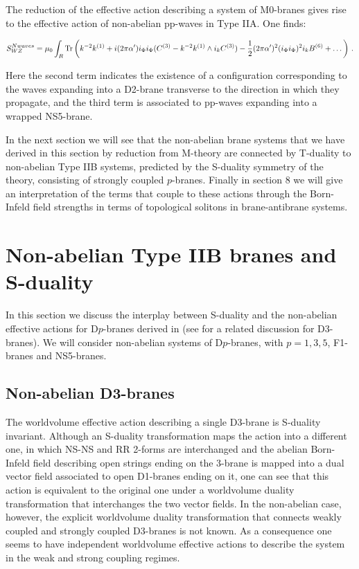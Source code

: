 \documentclass[12pt,a4paper]{article}
\begin{document}
The reduction of the effective action describing a system of M0-branes
gives rise to the effective action of non-abelian pp-waves in 
Type IIA. One finds:

\begin{equation}
\label{ppwaves}
S^{N waves}_{WZ}=\mu_0\int_R {\rm Tr}\left(k^{-2}k^{(1)}+i
(2\pi\alpha^\prime)i_\Phi i_\Phi (C^{(3)}-k^{-2}k^{(1)}\wedge
i_k C^{(3)})-\frac12 (2\pi\alpha^\prime)^2 (i_\Phi i_\Phi)^2
i_k B^{(6)}+\dots\right)\, .
\end{equation}

\noindent Here the second term indicates the existence of a configuration
corresponding to the waves expanding into a D2-brane transverse to
the direction in which they propagate, and the third term is
associated to pp-waves expanding into a wrapped NS5-brane. 


In the next section we will see that the non-abelian brane
systems that we have derived in this section by reduction from M-theory
are connected
by T-duality to non-abelian Type IIB systems, predicted by the 
S-duality symmetry of the theory, consisting of strongly
coupled $p$-branes.  
Finally in section 8 we will give an interpretation of the terms that
couple to these actions through the Born-Infeld field strengths in
terms of topological solitons in brane-antibrane systems.



\section{Non-abelian Type IIB branes and S-duality}

In this section we discuss the interplay between S-duality and the
non-abelian effective actions for D$p$-branes derived in 
\cite{Myers} (see \cite{TvR} for a related discussion for D3-branes).
We will consider non-abelian systems of D$p$-branes,
with $p=1,3,5$, F1-branes and NS5-branes.

\subsection{Non-abelian D3-branes}

The worldvolume effective action describing a
single D3-brane is S-duality invariant. Although an S-duality
transformation maps the action into a different one, in which NS-NS
and RR 2-forms are interchanged and the abelian Born-Infeld field
describing open strings ending on the 3-brane is mapped into a
dual vector field associated to open D1-branes ending on it, 
one can see that 
this action is equivalent to the original one under a worldvolume
duality transformation that interchanges the two vector
fields. 
In the non-abelian case, however, the explicit worldvolume duality
transformation that connects weakly coupled and strongly coupled
D3-branes is not known.
As a consequence one seems to have independent 
worldvolume effective actions
to describe the system in the weak and strong coupling regimes.
\end{document}

